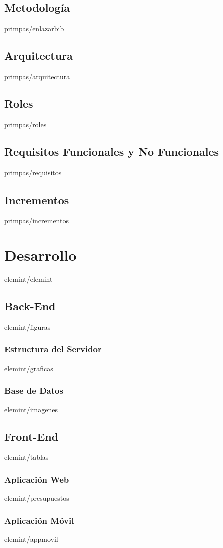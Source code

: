 \documentclass[epsbased,copyright,final,printable,covers,extendedindex,firstnumbered,tfg,gnuplot]{tfgtfmthesisuam}
\begin{document}
  \section{Metodología\label{SEC:ENLAZBIBLIOGRAFIA}}{primpas/enlazarbib}
  \section{Arquitectura\label{SEC:ARQUITECTURA}}{primpas/arquitectura}
  \section{Roles\label{SEC:ROLES}}{primpas/roles}
  \section{Requisitos Funcionales y No Funcionales\label{SEC:REQUISITOS}}{primpas/requisitos}
  \section{Incrementos\label{SEC:INCREMENTOS}}{primpas/incrementos}

\chapter{Desarrollo\label{CAP:ELEMINT}}{elemint/elemint}
  \section{Back-End\label{SEC:FIGURAS}}{elemint/figuras}
    \subsection{Estructura del Servidor\label{SS:GRAFICAS}}{elemint/graficas}
    \subsection{Base de Datos\label{SS:INMAGENES}}{elemint/imagenes}
  \section{Front-End\label{SEC:TABLAS}}{elemint/tablas}
    \subsection{Aplicación Web\label{SS:PRESUPUESTOS}}{elemint/presupuestos}
    \subsection{Aplicación Móvil\label{SS:APPMOVIL}}{elemint/appmovil}
\end{document}
